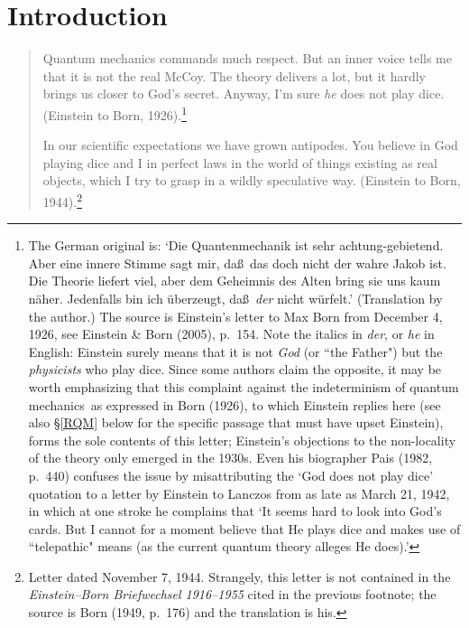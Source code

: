 \documentclass[11pt,a4paper]{article}
\numberwithin{equation}{section}
\newcommand{\qm}{quantum mechanics}
\begin{document}
\thispagestyle{empty}
\renewcommand{\thefootnote}{\arabic{footnote}}
\newpage \setcounter{footnote}{0}
\section{Introduction}
\begin{quote}\begin{small}
Quantum mechanics commands much respect. But an inner voice tells me that it is not the real McCoy. The theory delivers a lot, but it hardly brings us closer to God's secret. Anyway, I'm sure \emph{he} does not play dice. (Einstein to Born, 1926).\footnote{The German original is: `Die Quantenmechanik ist sehr achtung-gebietend. Aber eine innere Stimme sagt mir, da\ss\ das doch nicht der wahre Jakob ist. Die Theorie liefert viel, aber dem Geheimnis des Alten bring sie uns kaum n\"{a}her. Jedenfalls bin ich \"{u}berzeugt, da\ss\ \emph{der} nicht w\"{u}rfelt.' (Translation by the author.) The source is Einstein's letter to Max Born from December 4, 1926, see Einstein \& Born (2005), p.\ 154. Note the italics in \emph{der}, or \emph{he} in English: Einstein surely means that it is not \emph{God} (or ``the Father") but the \emph{physicists} who play dice. Since some authors claim the opposite, it may be worth emphasizing that this complaint against the indeterminism of \qm\ as expressed in Born (1926), to which Einstein replies here (see also \S\ref{RQM} below for the specific passage that must have upset Einstein), forms the sole contents of this letter; Einstein's objections to the non-locality  of the theory only emerged in the 1930s.
Even his biographer Pais (1982, p.\ 440) confuses the issue by misattributing the `God does not play dice' quotation to a letter by Einstein to Lanczos from as late as March 21, 1942, in which at one stroke he complains
that `It seems hard to look into God's cards. But I cannot for a moment believe that He plays dice and makes use of ``telepathic" means (as the current quantum theory alleges He does).'}

In our scientific expectations we have grown antipodes. You believe in God playing dice and I in perfect laws in the world of things existing as real objects, which I try to grasp in a wildly speculative way. (Einstein to Born, 1944).\footnote{Letter dated November 7, 1944. Strangely, this letter is not contained in the  \emph{Einstein--Born Briefwechsel 1916--1955} cited in the previous footnote; the source is Born (1949, p.\ 176) and the translation is his.}
\end{small}
\end{quote}
\end{document}
